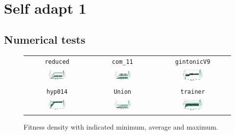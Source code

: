 \documentclass[11pt,a4paper]{scrartcl}
\begin{document}
\section{Self adapt 1}


\subsection{Numerical tests}

\begin{figure}[H]
\center
\begin{tabular}{ccc}
\texttt{reduced} & \texttt{com\_11} & \texttt{gintonicV9} \\
\includegraphics[width=0.3\textwidth]{img/self_adapt_1_reduced.png} &
\includegraphics[width=0.3\textwidth]{img/self_adapt_1_com_11.png} &
\includegraphics[width=0.3\textwidth]{img/self_adapt_1_gintonicV9.png} \\
\texttt{hyp014} & \texttt{Union} & \texttt{trainer} \\
\includegraphics[width=0.3\textwidth]{img/self_adapt_1_hyp014.png} &
\includegraphics[width=0.3\textwidth]{img/self_adapt_1_Union.png} &
\includegraphics[width=0.3\textwidth]{img/self_adapt_1_trainer.png}
\end{tabular}
\caption{Fitness density with indicated minimum, average and maximum.}
\label{fig:self_adapt_1}
\end{figure}
\end{document}
